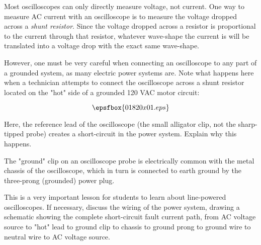 

Most oscilloscopes can only directly measure voltage, not current.  One way to measure AC current with an oscilloscope is to measure the voltage dropped across a {\it shunt resistor}.  Since the voltage dropped across a resistor is proportional to the current through that resistor, whatever wave-shape the current is will be translated into a voltage drop with the exact same wave-shape.

However, one must be very careful when connecting an oscilloscope to any part of a grounded system, as many electric power systems are.  Note what happens here when a technician attempts to connect the oscilloscope across a shunt resistor located on the "hot" side of a grounded 120 VAC motor circuit:

$$\epsfbox{01820x01.eps}$$

Here, the reference lead of the oscilloscope (the small alligator clip, not the sharp-tipped probe) creates a short-circuit in the power system.  Explain why this happens.







The "ground" clip on an oscilloscope probe is electrically common with the metal chassis of the oscilloscope, which in turn is connected to earth ground by the three-prong (grounded) power plug.







This is a very important lesson for students to learn about line-powered oscilloscopes.  If necessary, discuss the wiring of the power system, drawing a schematic showing the complete short-circuit fault current path, from AC voltage source to "hot" lead to ground clip to chassis to ground prong to ground wire to neutral wire to AC voltage source.




